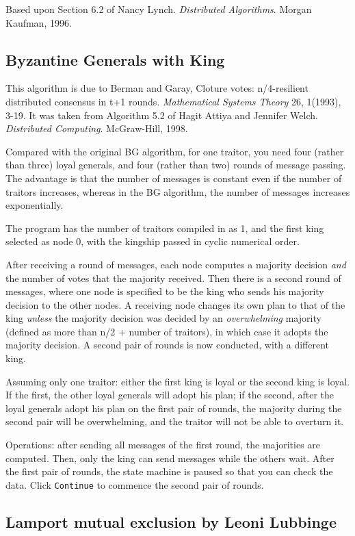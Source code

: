 \documentclass[11pt]{article}
\newcommand{\p}[1]{\texttt{#1}}
\begin{document}
Based upon Section 6.2 of Nancy Lynch. \emph{Distributed Algorithms}. Morgan Kaufman, 1996.

\subsection{Byzantine Generals with King}

This algorithm is due to Berman and Garay, Cloture votes: n/4-resilient
distributed consensus in t+1 rounds. \emph{Mathematical Systems Theory}
26, 1(1993), 3-19.
It was taken from Algorithm 5.2 of Hagit Attiya and Jennifer Welch.
\emph{Distributed Computing}. McGraw-Hill, 1998.


Compared with the original BG algorithm,
for one traitor, you need four (rather than three) loyal generals,
and four (rather than two) rounds of message passing.
The advantage is that the number of messages is constant even if
the number of traitors increases,
whereas in the BG algorithm, the number of messages increases
exponentially.

The program has the number of traitors compiled in as 1,
and the first king selected as node 0, with the kingship
passed in cyclic numerical order.

After receiving a round of messages, each node computes a
majority decision \emph{and} the number of votes that the
majority received. Then there is a second round of messages,
where one node is specified to be the king who sends his
majority decision to the other nodes. A receiving node changes
its own plan to that of the king \emph{unless} the majority
decision was decided by an \emph{overwhelming} majority (defined
as more than n/2 + number of traitors), in which case it adopts
the majority decision. A second pair of rounds is now conducted,
with a different king.

Assuming only one traitor: either the first king is loyal or the
second king is loyal. If the first, the other loyal generals
will adopt his plan; if the second, after the loyal generals
adopt his plan on the first pair of rounds, the majority during
the second pair will be overwhelming, and the traitor will not
be able to overturn it.

Operations: after sending all messages of the first round, the
majorities are computed. Then, only the king can send messages
while the others wait. After the first pair of rounds, the state
machine is paused so that you can check the data. Click
\p{Continue} to commence the second pair of rounds.
\subsection{Lamport mutual exclusion by Leoni Lubbinge}
\end{document}
